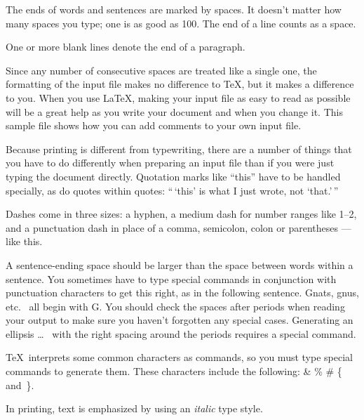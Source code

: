 \documentclass[ba]{imsart}
\numberwithin{equation}{section}
\theoremstyle{plain}
\begin{document}
The ends of words and sentences are marked by spaces. It doesn't
matter how many spaces you type; one is as good as 100.  The end of a
line counts as a space.

One or more blank lines denote the end of a paragraph.

Since any number of consecutive spaces are treated like a single one,
the formatting of the input file makes no difference to
\TeX, %
but it makes a difference to you.  When you use
\LaTeX, %
making your input file as easy to read as possible will be a great
help as you write your document and when you change it.  This sample
file shows how you can add comments to your own input file.

Because printing is different from typewriting, there are a number of
things that you have to do differently when preparing an input file
than if you were just typing the document directly.  Quotation marks
like ``this'' have to be handled specially, as do quotes within
quotes: ``\,`this' %
is what I just wrote, not `that.'\,''

Dashes come in three sizes: a hyphen, %
a medium dash for number ranges like 1--2, and a punctuation dash in
place of a comma, semicolon, colon or parentheses ---like this.

A sentence-ending space should be larger than the space between words
within a sentence.  You sometimes have to type special commands in
conjunction with punctuation characters to get this right, as in the
following sentence.  Gnats, gnus,
etc.\ %
all begin with G\@.  %
You should check the spaces after periods when reading your output to
make sure you haven't forgotten any special cases.  Generating an
ellipsis \ldots\ %
with the right spacing around the periods
requires a special  command.

\TeX\ interprets some common characters as commands, so you must type
special commands to generate them.  These characters include the
following:
        \& \% \# \{ and~\}.

In printing, text is emphasized by using an {\em
          italic\/} %
type style.
\end{document}
